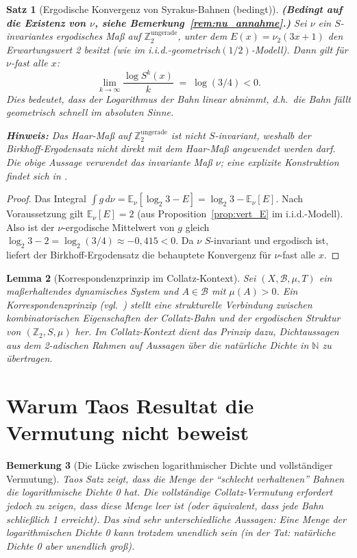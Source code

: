 \documentclass[12pt,a4paper]{article}
\newtheorem{theorem}{Satz}[section]
\newtheorem{lemma}[theorem]{Lemma}
\newtheorem{remark}[theorem]{Bemerkung}
\begin{document}
\begin{theorem}[Ergodische Konvergenz von Syrakus-Bahnen (bedingt)]\label{thm:ergod_konv}
\textbf{(Bedingt auf die Existenz von $\nu$, siehe Bemerkung~\ref{rem:nu_annahme}.)}
Sei $\nu$ ein $S$-invariantes ergodisches Maß auf $\mathbb{Z}_2^{\text{ungerade}}$, unter
dem $E(x) = \nu_2(3x+1)$ den Erwartungswert 2 besitzt (wie im i.i.d.-geometrisch$(1/2)$-Modell).
Dann gilt für $\nu$-fast alle $x$:
\[
  \lim_{k \to \infty} \frac{\log S^k(x)}{k} \;=\; \log(3/4) < 0.
\]
Dies bedeutet, dass der Logarithmus der Bahn linear abnimmt, d.h.\ die Bahn fällt
\emph{geometrisch schnell} im absoluten Sinne.

\textbf{Hinweis:} Das Haar-Maß auf $\mathbb{Z}_2^{\text{ungerade}}$ ist \emph{nicht}
$S$-invariant, weshalb der Birkhoff-Ergodensatz nicht direkt mit dem Haar-Maß angewendet
werden darf. Die obige Aussage verwendet das invariante Maß $\nu$; eine explizite
Konstruktion findet sich in \cite{Kontorovich2010}.
\end{theorem}

\begin{proof}
Das Integral $\int g\, d\nu = \mathbb{E}_\nu[\log_2 3 - E] = \log_2 3 - \mathbb{E}_\nu[E]$.
Nach Voraussetzung gilt $\mathbb{E}_\nu[E] = 2$
(aus Proposition~\ref{prop:vert_E} im i.i.d.-Modell).
Also ist der $\nu$-ergodische Mittelwert von $g$ gleich $\log_2 3 - 2 = \log_2(3/4) \approx -0{,}415 < 0$.
Da $\nu$ $S$-invariant und ergodisch ist, liefert der Birkhoff-Ergodensatz die behauptete
Konvergenz für $\nu$-fast alle $x$.
\end{proof}

\begin{lemma}[Korrespondenzprinzip im Collatz-Kontext]\label{lem:furstenberg}
Sei $(X, \mathcal{B}, \mu, T)$ ein maßerhaltendes dynamisches System und $A \in \mathcal{B}$
mit $\mu(A) > 0$. Ein Korrespondenzprinzip (vgl.~\cite{Tao2022}) stellt eine
strukturelle Verbindung zwischen kombinatorischen Eigenschaften der Collatz-Bahn und der
ergodischen Struktur von $(\mathbb{Z}_2, S, \mu)$ her.
Im Collatz-Kontext dient das Prinzip dazu, Dichtaussagen aus dem 2-adischen Rahmen auf
Aussagen über die natürliche Dichte in $\mathbb{N}$ zu übertragen.
\end{lemma}

\section{Warum Taos Resultat die Vermutung nicht beweist}

\begin{remark}[Die Lücke zwischen logarithmischer Dichte und vollständiger Vermutung]\label{rem:luecke}
Taos Satz zeigt, dass die Menge der ``schlecht verhaltenen'' Bahnen die logarithmische
Dichte 0 hat. Die vollständige Collatz-Vermutung erfordert jedoch zu zeigen, dass diese
Menge \emph{leer} ist (oder äquivalent, dass jede Bahn schließlich 1 erreicht). Das sind
sehr unterschiedliche Aussagen: Eine Menge der logarithmischen Dichte 0 kann trotzdem
unendlich sein (in der Tat: natürliche Dichte 0 aber unendlich groß).
\end{remark}
\end{document}
